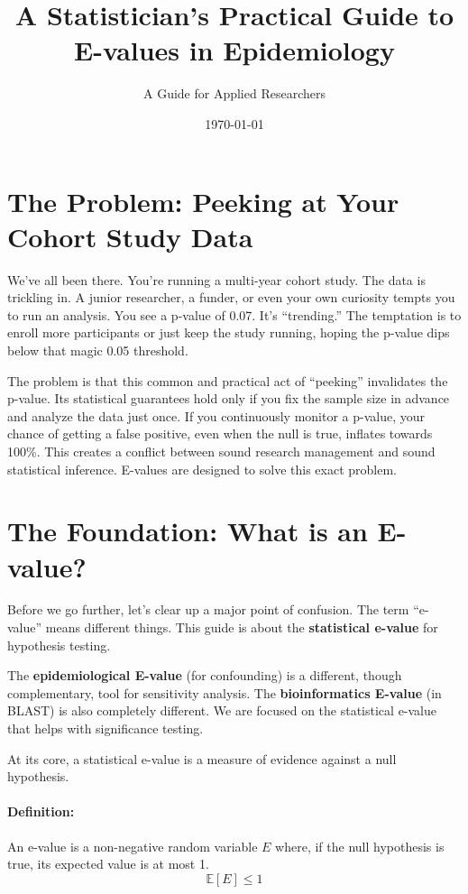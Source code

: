 \documentclass[11pt]{article}
\begin{document}
\title{A Statistician's Practical Guide to E-values in Epidemiology}
\author{A Guide for Applied Researchers}
\date{\today}
\maketitle

\section*{The Problem: Peeking at Your Cohort Study Data}

We've all been there. You're running a multi-year cohort study. The data is trickling in. A junior researcher, a funder, or even your own curiosity tempts you to run an analysis. You see a p-value of 0.07. It's ``trending.'' The temptation is to enroll more participants or just keep the study running, hoping the p-value dips below that magic 0.05 threshold.

The problem is that this common and practical act of ``peeking'' invalidates the p-value. Its statistical guarantees hold only if you fix the sample size in advance and analyze the data just once. If you continuously monitor a p-value, your chance of getting a false positive, even when the null is true, inflates towards 100\%. This creates a conflict between sound research management and sound statistical inference. E-values are designed to solve this exact problem.

\section*{The Foundation: What is an E-value?}

Before we go further, let's clear up a major point of confusion. The term ``e-value'' means different things. This guide is about the \textbf{statistical e-value} for hypothesis testing.

\begin{notebox}
The \textbf{epidemiological E-value} (for confounding) is a different, though complementary, tool for sensitivity analysis. The \textbf{bioinformatics E-value} (in BLAST) is also completely different. We are focused on the statistical e-value that helps with significance testing.
\end{notebox}

At its core, a statistical e-value is a measure of evidence against a null hypothesis.

\paragraph{Definition:} An e-value is a non-negative random variable $E$ where, if the null hypothesis is true, its expected value is at most 1.
$$ \mathbb{E}[E] \le 1 $$
\end{document}
